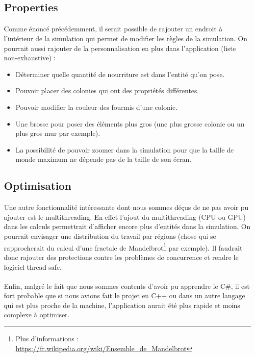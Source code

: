 \documentclass{EPUProjetDi}
\begin{document}
\subsection{Properties}
\paragraph{}
Comme énoncé précédemment, il serait possible de rajouter un endroit à l'intérieur de la simulation qui permet de modifier les règles de la simulation.
On pourrait aussi rajouter de la personnalisation en plus dans l'application (liste non-exhaustive) : 
\begin{itemize}
    \item Déterminer quelle quantité de nourriture est dans l'entité qu'on pose.
    \item Pouvoir placer des colonies qui ont des propriétés différentes.
    \item Pouvoir modifier la couleur des fourmis d'une colonie.
    \item Une brosse pour poser des éléments plus gros (une plus grosse colonie ou un plus gros mur par exemple).
    \item La possibilité de pouvoir zoomer dans la simulation pour que la taille de monde maximum ne dépende pas de la taille de son écran.
\end{itemize}

\subsection{Optimisation}
\paragraph{}
Une autre fonctionnalité intéressante dont nous sommes déçus de ne pas avoir pu ajouter est le multithreading. En effet l'ajout du multithreading (CPU ou GPU) dans les calculs permettrait d'afficher 
encore plus d'entités dans la simulation. On pourrait envisager une distribution du travail par régions 
(chose qui se rapprocherait du calcul d'une fractale de Mandelbrot\footnote{Plus d'informations : \url{https://fr.wikipedia.org/wiki/Ensemble_de_Mandelbrot}} par exemple).
Il faudrait donc rajouter des protections contre les problèmes de concurrence et rendre le logiciel thread-safe. 

\paragraph{}
Enfin, malgré le fait que nous sommes contents d'avoir pu apprendre le C\#, il est fort probable que si nous avions fait le projet en C++ 
ou dans un autre langage qui est plus proche de la machine, l'application aurait été plus rapide et moins complexe à optimiser.
\end{document}
